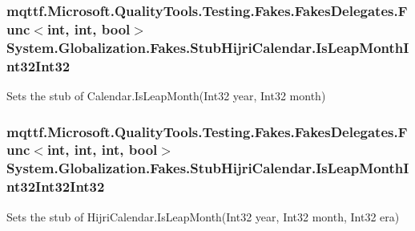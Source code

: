 \hypertarget{class_system_1_1_globalization_1_1_fakes_1_1_stub_hijri_calendar_ac6a839ee63a7edc77bc63e53cf551307}{
\subsubsection[{Is\-Leap\-Month\-Int32\-Int32}]{\setlength{\rightskip}{0pt plus 5cm}mqttf.\-Microsoft.\-Quality\-Tools.\-Testing.\-Fakes.\-Fakes\-Delegates.\-Func$<$int, int, bool$>$ System.\-Globalization.\-Fakes.\-Stub\-Hijri\-Calendar.\-Is\-Leap\-Month\-Int32\-Int32}}\label{class_system_1_1_globalization_1_1_fakes_1_1_stub_hijri_calendar_ac6a839ee63a7edc77bc63e53cf551307}


Sets the stub of Calendar.\-Is\-Leap\-Month(\-Int32 year, Int32 month)

\hypertarget{class_system_1_1_globalization_1_1_fakes_1_1_stub_hijri_calendar_ae07fb31d94c4b3ef7761db1e1b363b29}{
\subsubsection[{Is\-Leap\-Month\-Int32\-Int32\-Int32}]{\setlength{\rightskip}{0pt plus 5cm}mqttf.\-Microsoft.\-Quality\-Tools.\-Testing.\-Fakes.\-Fakes\-Delegates.\-Func$<$int, int, int, bool$>$ System.\-Globalization.\-Fakes.\-Stub\-Hijri\-Calendar.\-Is\-Leap\-Month\-Int32\-Int32\-Int32}}\label{class_system_1_1_globalization_1_1_fakes_1_1_stub_hijri_calendar_ae07fb31d94c4b3ef7761db1e1b363b29}


Sets the stub of Hijri\-Calendar.\-Is\-Leap\-Month(\-Int32 year, Int32 month, Int32 era)

